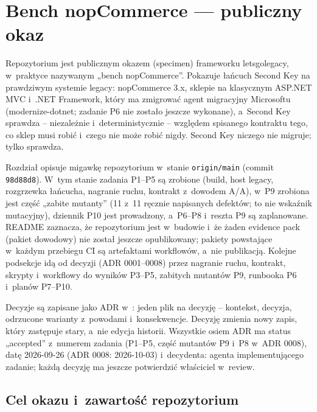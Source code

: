 \section{Bench nopCommerce --- publiczny okaz}\label{sec:bench}

Repozytorium  jest publicznym okazem
(specimen) frameworku letsgolegacy, w~praktyce nazywanym „bench nopCommerce”. Pokazuje
łańcuch Second Key na prawdziwym systemie legacy: nopCommerce 3.x, sklepie na klasycznym
ASP.NET MVC i~.NET Framework, który ma zmigrować agent migracyjny Microsoftu (modernize-dotnet;
zadanie P6 nie zostało jeszcze wykonane), a~Second Key sprawdza -- niezależnie
i~deterministycznie -- względem spisanego kontraktu
tego, co sklep musi robić i~czego nie może robić nigdy. Second Key niczego nie migruje;
tylko sprawdza.

Rozdział opisuje migawkę repozytorium w~stanie \texttt{origin/main} (commit
\texttt{98d88d8}). W~tym stanie zadania P1--P5 są zrobione (build, host legacy, rozgrzewka
łańcucha, nagranie ruchu, kontrakt z~dowodem A/A), w~P9 zrobiona jest część „zabite
mutanty” (11 z~11 ręcznie napisanych defektów; to nie wskaźnik mutacyjny), dziennik P10 jest
prowadzony, a~P6--P8 i~reszta P9 są zaplanowane. README
zaznacza, że repozytorium jest w~budowie i~że żaden evidence pack (pakiet dowodowy) nie
został jeszcze opublikowany; pakiety powstające w~każdym przebiegu CI są artefaktami
workflowów, a~nie publikacją. Kolejne podsekcje idą od decyzji (ADR 0001--0008) przez
nagranie ruchu, kontrakt, skrypty i~workflowy do wyników P3--P5, zabitych mutantów P9,
runbooka P6 i~planów P7--P10.

Decyzje są zapisane jako ADR w~: jeden plik na decyzję -- kontekst, decyzja,
odrzucone warianty z~powodami i~konsekwencje. Decyzję zmienia nowy zapis, który zastępuje
stary, a~nie edycja historii. Wszystkie osiem ADR ma status „accepted” z~numerem zadania
(P1--P5, część mutantów P9 i~P8 w~ADR 0008), datę 2026-09-26 (ADR 0008: 2026-10-03)
i~decydenta: agenta implementującego zadanie; każdą decyzję ma jeszcze potwierdzić właściciel
w~review.


\subsection{Cel okazu i~zawartość repozytorium}\label{sec:bench-cel}

